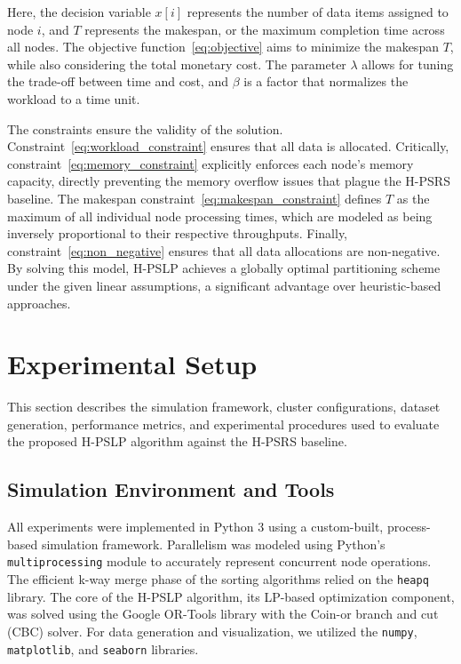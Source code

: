 \documentclass{article}
\begin{document}
Here, the decision variable $x[i]$ represents the number of data items assigned to node $i$, and $T$ represents the makespan, or the maximum completion time across all nodes. The objective function~\eqref{eq:objective} aims to minimize the makespan $T$, while also considering the total monetary cost. The parameter $\lambda$ allows for tuning the trade-off between time and cost, and $\beta$ is a factor that normalizes the workload to a time unit.

The constraints ensure the validity of the solution. Constraint~\eqref{eq:workload_constraint} ensures that all data is allocated. Critically, constraint~\eqref{eq:memory_constraint} explicitly enforces each node's memory capacity, directly preventing the memory overflow issues that plague the H-PSRS baseline. The makespan constraint~\eqref{eq:makespan_constraint} defines $T$ as the maximum of all individual node processing times, which are modeled as being inversely proportional to their respective throughputs. Finally, constraint~\eqref{eq:non_negative} ensures that all data allocations are non-negative. By solving this model, H-PSLP achieves a globally optimal partitioning scheme under the given linear assumptions, a significant advantage over heuristic-based approaches.



\section{Experimental Setup}

This section describes the simulation framework, cluster configurations, dataset generation, performance metrics, and experimental procedures used to evaluate the proposed H-PSLP algorithm against the H-PSRS baseline.

\subsection{Simulation Environment and Tools}

All experiments were implemented in Python 3 using a custom-built, process-based simulation framework. Parallelism was modeled using Python's \texttt{multiprocessing} module to accurately represent concurrent node operations. The efficient k-way merge phase of the sorting algorithms relied on the \texttt{heapq} library. The core of the H-PSLP algorithm, its LP-based optimization component, was solved using the Google OR-Tools library with the Coin-or branch and cut (CBC) solver. For data generation and visualization, we utilized the \texttt{numpy}, \texttt{matplotlib}, and \texttt{seaborn} libraries.
\end{document}
